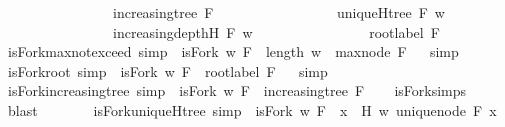 \begin{isabellebody}
\ \ \ \ \ \ \ \ \ \ \ \ \ \ \ {\isasymand}\ {\isacharparenleft}increasing{\isacharunderscore}tree\ F{\isacharparenright}\ \isanewline
\ \ \ \ \ \ \ \ \ \ \ \ \ \ \ {\isasymand}\ {\isacharparenleft}uniqueH{\isacharunderscore}tree\ F\ w{\isacharparenright}\ \isanewline
\ \ \ \ \ \ \ \ \ \ \ \ \ \ \ {\isasymand}\ {\isacharparenleft}increasing{\isacharunderscore}depth{\isacharunderscore}H\ F\ w{\isacharparenright}\isanewline
\ \ \ \ \ \ \ \ \ \ \ \ \ \ \ {\isasymand}\ root{\isacharunderscore}label{\isacharunderscore}{}\ F{\isacharparenright}{\isachardoublequoteclose}\isanewline
\isanewline
{}\isamarkupfalse%
\ isFork{\isacharunderscore}max{\isacharunderscore}not{\isacharunderscore}exceed\ {\isacharbrackleft}simp{\isacharbrackright}\ {\isacharcolon}\ {\isachardoublequoteopen}isFork\ w\ F\ {\isasymlongrightarrow}\ length\ w\ {\isasymge}\ max{\isacharunderscore}node\ F{\isachardoublequoteclose}%
\isadelimproof
\ %
\endisadelimproof
%
\isatagproof
{}\isamarkupfalse%
\ simp%
\endisatagproof
{\isafoldproof}%
%
\isadelimproof
%
\endisadelimproof
\isanewline
\isanewline
{}\isamarkupfalse%
\ isFork{\isacharunderscore}root{\isacharunderscore}{}\ {\isacharbrackleft}simp{\isacharbrackright}\ {\isacharcolon}\ {\isachardoublequoteopen}isFork\ w\ F\ {\isasymlongrightarrow}\ root{\isacharunderscore}label{\isacharunderscore}{}\ F{\isachardoublequoteclose}%
\isadelimproof
\ %
\endisadelimproof
%
\isatagproof
{}\isamarkupfalse%
\ simp%
\endisatagproof
{\isafoldproof}%
%
\isadelimproof
%
\endisadelimproof
\isanewline
\isanewline
{}\isamarkupfalse%
\ isFork{\isacharunderscore}increasing{\isacharunderscore}tree\ {\isacharbrackleft}simp{\isacharbrackright}\ {\isacharcolon}\ {\isachardoublequoteopen}isFork\ w\ F\ {\isasymlongrightarrow}\ increasing{\isacharunderscore}tree\ F{\isachardoublequoteclose}\isanewline
%
\isadelimproof
\ \ %
\endisadelimproof
%
\isatagproof
{}\isamarkupfalse%
\ isFork{\isachardot}simps\ \isamarkupfalse%
\ blast%
\endisatagproof
{\isafoldproof}%
%
\isadelimproof
\ \isanewline
%
\endisadelimproof
\ \ \ \ \isanewline
{}\isamarkupfalse%
\ isFork{\isacharunderscore}uniqueH{\isacharunderscore}tree\ {\isacharbrackleft}simp{\isacharbrackright}\ {\isacharcolon}\ {\isachardoublequoteopen}isFork\ w\ F\ {\isasymlongrightarrow}\ {\isacharparenleft}{\isasymforall}x\ {\isasymin}\ H\ w{\isachardot}\ unique{\isacharunderscore}node\ F\ x{\isacharparenright}{\isachardoublequoteclose}\isanewline
%
\isadelimproof
\ \ %
\endisadelimproof

\end{isabellebody}
